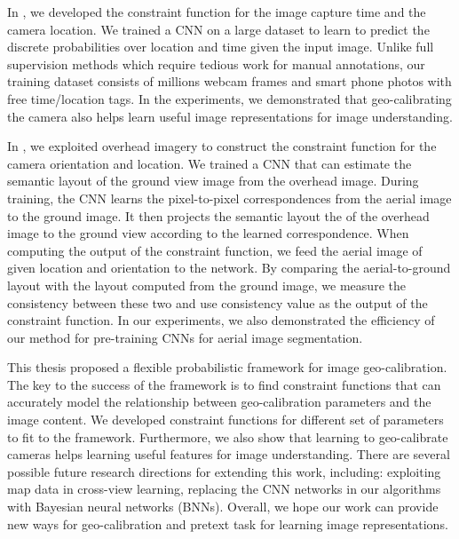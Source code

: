 In , we developed the constraint function for 
the image capture time and the camera location. 
We trained a CNN on a large dataset to learn to predict the discrete
probabilities over location and time given the input image.
Unlike full supervision methods which require tedious work for manual
annotations, our training dataset consists of millions webcam
frames and smart phone photos with free time/location tags.
In the experiments, we demonstrated that geo-calibrating the camera
also helps learn useful image representations for image understanding.

In , we exploited overhead imagery to construct
the constraint function for the camera orientation and location.
We trained a CNN that can estimate the semantic layout of the ground
view image from the overhead image. During training, the CNN learns the
pixel-to-pixel correspondences from the aerial image to the ground
image. 
It then projects the semantic layout the of the overhead image to the
ground view according to the learned correspondence.
When computing the output of the constraint function, we feed the
aerial image of given location and orientation to the network. By
comparing the aerial-to-ground layout with the layout computed from
the ground image, we measure the consistency between these two and use
consistency value as the output of the constraint function. 
In our experiments, we also demonstrated the efficiency of our method
for pre-training CNNs for aerial image segmentation.

This thesis proposed a flexible probabilistic framework for image
geo-calibration. The key to the success of the framework is to find
constraint functions that can accurately model the relationship between
geo-calibration parameters and the image content. 
We developed constraint functions for different set of parameters to
fit to the framework. 
Furthermore, we also show that learning to geo-calibrate cameras helps
learning useful features for image understanding. There are several
possible future research directions for extending this work,
including: exploiting map data in cross-view learning, replacing the
CNN networks in our algorithms with Bayesian neural networks (BNNs).
Overall, we hope our work can provide new ways for geo-calibration and
pretext task for learning image representations.
